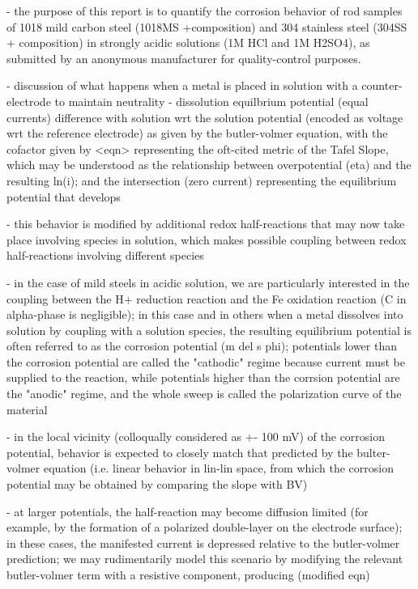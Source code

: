 - the purpose of this report is to quantify the corrosion behavior of rod samples of 1018 mild carbon steel (1018MS +composition) and 304 stainless steel (304SS + composition) in strongly acidic solutions (1M HCl and 1M H2SO4), as submitted by an anonymous manufacturer for quality-control purposes.

- discussion of what happens when a metal is placed in solution with a counter-electrode to maintain neutrality - dissolution equilbrium potential (equal currents) difference with solution wrt the solution potential (encoded as voltage wrt the reference electrode) as given by the butler-volmer equation, with the cofactor given by <eqn> representing the oft-cited metric of the Tafel Slope, which may be understood as the relationship between overpotential (eta) and the resulting ln(i); and the intersection (zero current) representing the equilibrium potential that develops

- this behavior is modified by additional redox half-reactions that may now take place involving species in solution, which makes possible coupling between redox half-reactions involving different species

- in the case of mild steels in acidic solution, we are particularly interested in the coupling between the H+ reduction reaction and the Fe oxidation reaction (C in alpha-phase is negligible); in this case and in others when a metal dissolves into solution by coupling with a solution species, the resulting equilibrium potential is often referred to as the corrosion potential (m del s phi); potentials lower than the corrosion potential are called the "cathodic" regime because current must be supplied to the reaction, while potentials higher than the corrsion potential are the "anodic" regime, and the whole sweep is called the polarization curve of the material

- in the local vicinity (colloqually considered as +- 100 mV) of the corrosion potential, behavior is expected to closely match that predicted by the bulter-volmer equation (i.e. linear behavior in lin-lin space, from which the corrosion potential may be obtained by comparing the slope with BV)

- at larger potentials, the half-reaction may become diffusion limited (for example, by the formation of a polarized double-layer on the electrode surface); in these cases, the manifested current is depressed relative to the butler-volmer prediction; we may rudimentarily model this scenario by modifying the relevant butler-volmer term with a resistive component, producing (modified eqn)

